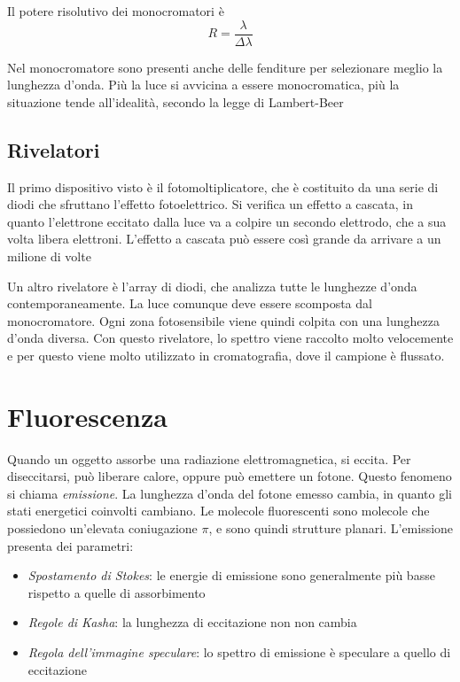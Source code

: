 Il potere risolutivo dei monocromatori è
\[
R = \frac{\lambda}{\Delta \lambda}
\]

Nel monocromatore sono presenti anche delle fenditure per selezionare meglio la lunghezza d'onda.
Più la luce si avvicina a essere monocromatica, più la situazione tende all'idealità, secondo la legge di Lambert-Beer

\subsection{Rivelatori}
Il primo dispositivo visto è il fotomoltiplicatore, che è costituito da una serie di diodi che sfruttano l'effetto fotoelettrico.
Si verifica un effetto a cascata, in quanto l'elettrone eccitato dalla luce va a colpire un secondo elettrodo, che a sua volta libera elettroni.
L'effetto a cascata può essere così grande da arrivare a un milione di volte


Un altro rivelatore è l'array di diodi, che analizza tutte le lunghezze d'onda contemporaneamente.
La luce comunque deve essere scomposta dal monocromatore.
Ogni zona fotosensibile viene quindi colpita con una lunghezza d'onda diversa.
Con questo rivelatore, lo spettro viene raccolto molto velocemente e per questo viene molto utilizzato in cromatografia, dove il campione è flussato.


\section{Fluorescenza}
Quando un oggetto assorbe una radiazione elettromagnetica, si eccita. Per diseccitarsi, può liberare calore, oppure può emettere un fotone. Questo fenomeno si chiama \emph{emissione}.
La lunghezza d'onda del fotone emesso cambia, in quanto gli stati energetici coinvolti cambiano.
Le molecole fluorescenti sono molecole che possiedono un'elevata coniugazione $\pi$, e sono quindi strutture planari.
L'emissione presenta dei parametri:
\begin{itemize}
\item \textit{Spostamento di Stokes}: le energie di emissione sono generalmente più basse rispetto a quelle di assorbimento
\item \textit{Regole di Kasha}: la lunghezza di eccitazione non non cambia
\item \textit{Regola dell'immagine speculare}: lo spettro di emissione è speculare a quello di eccitazione
\end{itemize}

